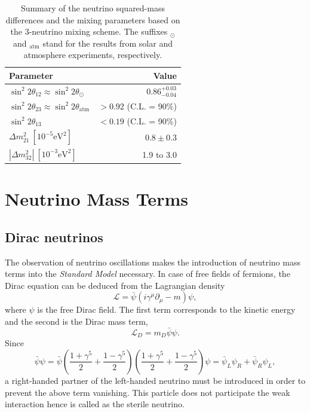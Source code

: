 \begin{table}[tbhp]
  \centering
  \caption{Summary of the neutrino squared-mass differences and the         
    mixing parameters based on the 3-neutrino mixing scheme. The         suffixes $_\odot$ and $_{\mbox{atm}}$ stand for the results from         solar and atmosphere experiments, respectively.}
  \label{tab:par}
  \begin{tabular}{lr}\hline\hline
    Parameter & Value \\\hline
    $\sin^{2}2\theta_{12} \approx \sin^{2}2\theta_{\odot}$ &    
$0.86^{+0.03}_{-0.04}$ \\
    $\sin^{2}2\theta_{23} \approx \sin^{2}2\theta_{\mbox{atm}}$ &        
$>0.92$ (C.L. = 90\%) \\
    $\sin^{2}2\theta_{13}$ & $<0.19$ (C.L. = 90\%) \\
    $\Delta m^{2}_{21}~[10^{-5}\mbox{eV}^{2}]$ & $0.8 \pm 0.3$ \\
    $|\Delta m^{2}_{32}|~[10^{-3}\mbox{eV}^{2}]$ & 1.9 to 3.0        
\\\hline\hline
  \end{tabular}
\end{table}

\section{Neutrino Mass Terms}
\label{sec:nema}
\subsection{Dirac neutrinos}
\label{sec:dirac}
The observation of neutrino oscillations makes the introduction of
neutrino mass terms into the \emph{Standard Model} necessary. In case
of free fields of fermions, the Dirac equation can be deduced from the
Lagrangian density
\begin{equation}
  \label{eq:deq}
  \mathcal{L} = \bar{\psi} (i\gamma^{\mu}\partial_{\mu}-m) \psi,
\end{equation}
where $\psi$ is the free Dirac field. The first term corresponds to
the kinetic energy and the second is the Dirac mass term,
\begin{equation}
  \label{eq:dm}
  \mathcal{L}_D=m_{D}\bar{\psi}\psi.
\end{equation}
Since
\begin{equation}
  \label{eq:2psi}
  \bar{\psi}\psi =  \bar{\psi}    
\left(\frac{1+\gamma^5}{2}+\frac{1-\gamma^5}{2}\right)
  \left(\frac{1+\gamma^5}{2}+\frac{1-\gamma^5}{2}\right) \psi =
  \bar{\psi}_{L}\psi_{R}+\bar{\psi}_{R}\psi_{L},
\end{equation}
a right-handed partner of the left-handed neutrino must be introduced
in order to prevent the above term vanishing. This particle does not
participate the weak interaction hence is called as the sterile
neutrino.


